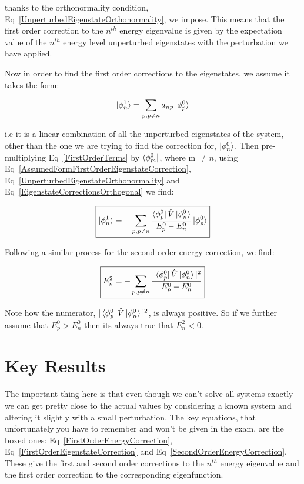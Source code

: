 \noindent thanks to the orthonormality condition, Eq~\ref{UnperturbedEigenstateOrthonormality}, we impose. This means that the first order correction to the $n^{th}$ energy eigenvalue is given by the expectation value of the $n^{th}$ energy level unperturbed eigenstates with the perturbation we have applied.

\noindent Now in order to find the first order corrections to the eigenstates, we assume it takes the form:

\begin{equation}
    \ket{\phi^1_n} = \sum_{p, p \neq n} a_{np} \ket{\phi^0_p}
    \label{AssumedFormFirstOrderEigenstateCorrection}
\end{equation}

\noindent i.e it is a linear combination of all the unperturbed eigenstates of the system, other than the one we are trying to find the correction for, $\ket{\phi^0_n}$. Then pre-multiplying Eq~\ref{FirstOrderTerms} by $\bra{\phi^0_m}$, where m $\neq n$, using Eq~\ref{AssumedFormFirstOrderEigenstateCorrection}, Eq~\ref{UnperturbedEigenstateOrthonormality} and Eq~\ref{EigenstateCorrectionsOrthogonal} we find:

\begin{equation}
    \boxed{\ket{\phi^1_n} = - \sum_{p, p \neq n} \frac{\bra{\phi^0_p}  \Hat{V}  \ket{\phi^0_n}}{{E^0_p - E^0_n}} \ket{\phi^0_p}}
    \label{FirstOrderEigenstateCorrection}
\end{equation}

\noindent Following a similar process for the second order energy correction, we find:

\begin{equation}
    \boxed{E^2_n = - \sum_{p, p \neq n} \frac{|\bra{\phi^0_p}  \Hat{V}  \ket{\phi^0_n}|^2}{{E^0_p - E^0_n}}}
    \label{SecondOrderEnergyCorrection}
\end{equation}

\noindent Note how the numerator, $|\bra{\phi^0_p}  \Hat{V}  \ket{\phi^0_n}|^2$, is always positive. So if we further assume that $E^0_p > E^0_n$ then its always true that $E^2_n < 0$.

\section{Key Results}

The important thing here is that even though we can't solve all systems exactly we can get pretty close to the actual values by considering a known system and altering it slightly with a small perturbation. The key equations, that unfortunately you have to remember and won't be given in the exam, are the boxed ones: Eq~\ref{FirstOrderEnergyCorrection}, Eq~\ref{FirstOrderEigenstateCorrection} and Eq~\ref{SecondOrderEnergyCorrection}. These give the first and second order corrections to the $n^{th}$ energy eigenvalue and the first order correction to the corresponding eigenfunction.
